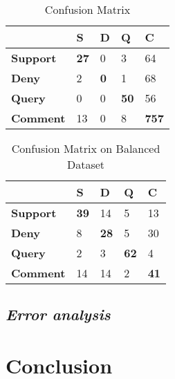 \documentclass[sigconf]{acmart}
\begin{document}
\begin{table}
\begin{center}
\begin{tabular}{ p{2cm} p{0.75cm} p{0.75cm} p{0.75cm} p{0.75cm} }
 \hline
   & \textbf{S} & \textbf{D} & \textbf{Q} & \textbf{C}\\
 \hline
 \textbf{Support} &  \textbf{27} & 0 & 3 & 64\\
 \hline
 \textbf{Deny} &  2 & \textbf{0} & 1 & 68\\
 \hline
 \textbf{Query} & 0 & 0 & \textbf{50} & 56\\
 \hline
 \textbf{Comment} & 13 & 0 & 8 & \textbf{757}\\
 \hline
\end{tabular}
\end{center}
\caption{\label{confusion-matrix} Confusion Matrix}
\end{table}


\begin{table}
\begin{center}
\begin{tabular}{ p{2cm} p{0.75cm} p{0.75cm} p{0.75cm} p{0.75cm} }
 \hline
   & \textbf{S} & \textbf{D} & \textbf{Q} & \textbf{C}\\
 \hline
 \textbf{Support} &  \textbf{39} & 14 & 5 & 13\\
 \hline
 \textbf{Deny} &  8 & \textbf{28} & 5 & 30\\
 \hline
 \textbf{Query} & 2 & 3 & \textbf{62} & 4\\
 \hline
 \textbf{Comment} & 14 & 14 & 2 & \textbf{41}\\
 \hline
\end{tabular}
\end{center}
\caption{\label{confusion-matrix-balance} Confusion Matrix on Balanced Dataset}
\end{table}

\subsection{\em Error analysis}

\section{Conclusion}




\end{document}
